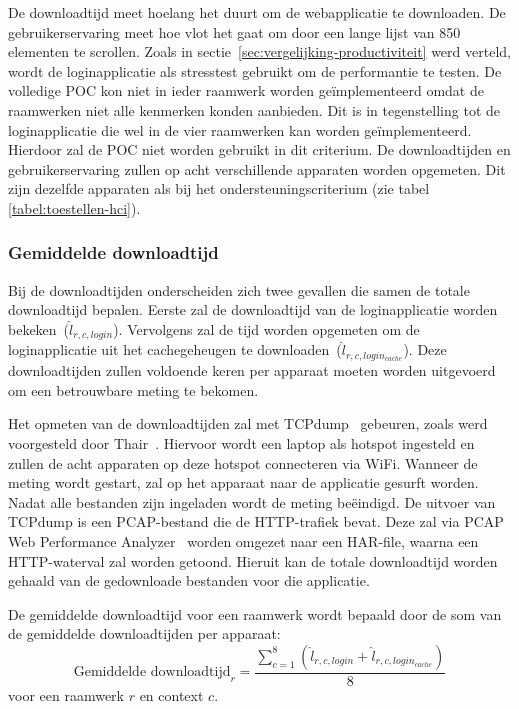De downloadtijd meet hoelang het duurt om de webapplicatie te downloaden.
De gebruikerservaring meet hoe vlot het gaat om door een lange lijst van 850 elementen te scrollen.
Zoals in sectie~\ref{sec:vergelijking-productiviteit} werd verteld, wordt de loginapplicatie als stresstest gebruikt om de performantie te testen.
De volledige POC kon niet in ieder raamwerk worden geïmplementeerd omdat de raamwerken niet alle kenmerken konden aanbieden.
Dit is in tegenstelling tot de loginapplicatie die wel in de vier raamwerken kan worden geïmplementeerd.
Hierdoor zal de POC niet worden gebruikt in dit criterium.
De downloadtijden en gebruikerservaring zullen op acht verschillende apparaten worden opgemeten.
Dit zijn dezelfde apparaten als bij het ondersteuningscriterium (zie tabel \ref{tabel:toestellen-hci}).

\subsubsection{Gemiddelde downloadtijd}
Bij de downloadtijden onderscheiden zich twee gevallen die samen de totale downloadtijd bepalen.
Eerste zal de  downloadtijd van de loginapplicatie worden bekeken~($\widehat{l}_{r,c,login}$). 
Vervolgens zal de tijd worden opgemeten om de loginapplicatie uit het cachegeheugen te downloaden~($\widehat{l}_{r,c,login_{cache}}$).
Deze downloadtijden zullen voldoende keren per apparaat moeten worden uitgevoerd om een betrouwbare meting te bekomen.

Het opmeten van de downloadtijden zal met TCPdump~\cite{Tcpdump2010} gebeuren, zoals werd voorgesteld door Thair~\cite{Thair2011}.
Hiervoor wordt een laptop als hotspot ingesteld en zullen de acht apparaten op deze hotspot connecteren via WiFi.
Wanneer de meting wordt gestart, zal op het apparaat naar de applicatie gesurft worden.
Nadat alle bestanden zijn ingeladen wordt de meting beëindigd. 
De uitvoer van TCPdump is een PCAP-bestand die de HTTP-trafiek bevat.
Deze zal via PCAP Web Performance Analyzer~\cite{SongL.bmcquadeMdsteele2010} worden omgezet naar een HAR-file, waarna een HTTP-waterval zal worden getoond.
Hieruit kan de totale downloadtijd worden gehaald van de gedownloade bestanden voor die applicatie.

De gemiddelde downloadtijd voor een raamwerk wordt bepaald door de som van de gemiddelde downloadtijden per apparaat:
\begin{equation}
  \text{Gemiddelde downloadtijd}_r= \frac{\sum\limits_{c=1}^{8}{\left(\widehat{l}_{r,c,login}+\widehat{l}_{r,c,login_{cache}}\right)}}{8}
    \label{eq:totale-downloadtijd}
\end{equation}
voor een raamwerk $r$ en context $c$.

